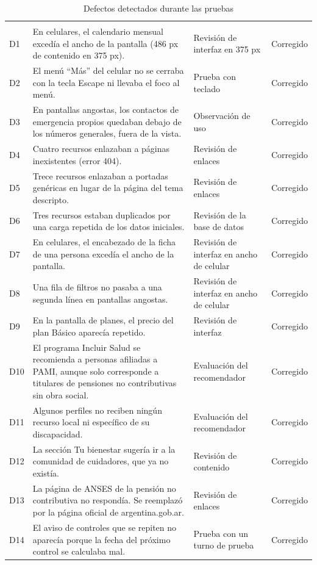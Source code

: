 {\small
\begin{xltabular}{\textwidth}{l >{\raggedright\arraybackslash}X >{\raggedright\arraybackslash}X l}
\caption{Defectos detectados durante las pruebas}\label{tab:c7-11}\\
\toprule
{} &  &  &  \\
\midrule
\endfirsthead
\toprule
{} &  &  &  \\
\midrule
\endhead
\bottomrule
\endfoot
D1 & En celulares, el calendario mensual excedía el ancho de la pantalla (486 px de contenido en 375 px). & Revisión de interfaz en 375 px & Corregido \\
D2 & El menú ``Más'' del celular no se cerraba con la tecla Escape ni llevaba el foco al menú. & Prueba con teclado & Corregido \\
D3 & En pantallas angostas, los contactos de emergencia propios quedaban debajo de los números generales, fuera de la vista. & Observación de uso & Corregido \\
D4 & Cuatro recursos enlazaban a páginas inexistentes (error 404). & Revisión de enlaces & Corregido \\
D5 & Trece recursos enlazaban a portadas genéricas en lugar de la página del tema descripto. & Revisión de enlaces & Corregido \\
D6 & Tres recursos estaban duplicados por una carga repetida de los datos iniciales. & Revisión de la base de datos & Corregido \\
D7 & En celulares, el encabezado de la ficha de una persona excedía el ancho de la pantalla. & Revisión de interfaz en ancho de celular & Corregido \\
D8 & Una fila de filtros no pasaba a una segunda línea en pantallas angostas. & Revisión de interfaz en ancho de celular & Corregido \\
D9 & En la pantalla de planes, el precio del plan Básico aparecía repetido. & Revisión de interfaz & Corregido \\
D10 & El programa Incluir Salud se recomienda a personas afiliadas a PAMI, aunque solo corresponde a titulares de pensiones no contributivas sin obra social. & Evaluación del recomendador & Corregido \\
D11 & Algunos perfiles no reciben ningún recurso local ni específico de su discapacidad. & Evaluación del recomendador & Corregido \\
D12 & La sección Tu bienestar sugería ir a la comunidad de cuidadores, que ya no existía. & Revisión de contenido & Corregido \\
D13 & La página de ANSES de la pensión no contributiva no respondía. Se reemplazó por la página oficial de argentina.gob.ar. & Revisión de enlaces & Corregido \\
D14 & El aviso de controles que se repiten no aparecía porque la fecha del próximo control se calculaba mal. & Prueba con un turno de prueba & Corregido \\
\end{xltabular}
}

